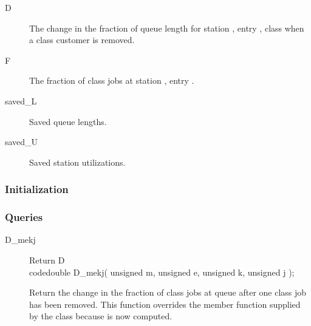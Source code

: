 \begin{description}
\item[D] \texonly{---} The change in the fraction of queue length for
  station , entry , class  when a class 
  customer is removed.
\item[F] \texonly{---} The fraction of class  jobs at station
  , entry . 
\item[saved_L] \texonly{---} Saved queue lengths.
\item[saved_U] \texonly{---} Saved station utilizations.
\end{description}

\subsubsection{Initialization}

\subsubsection{Queries}

\begin{description}

\item[D_mekj] \texonly{---} Return D\\
code{double D_mekj( unsigned m, unsigned e, unsigned k, unsigned j );}

Return the change in the fraction of class  jobs at queue
 after one class  job has been removed.  This function
overrides the member function supplied by the  class because
 is now computed.

\end{description}
        
